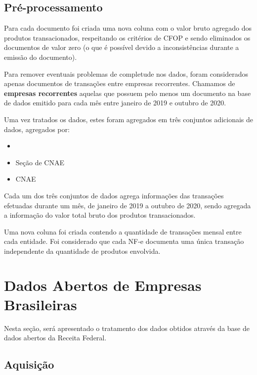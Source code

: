 \subsection{Pré-processamento}
\label{section:base-de-dados:dados-de-documentos-fiscais:preprocessamento}

Para cada documento foi criada uma nova coluna com o valor bruto agregado dos produtos transacionados, respeitando os critérios de CFOP e sendo eliminados os documentos de valor zero (o que é possível devido a inconsistências durante a emissão do documento).

Para remover eventuais problemas de completude nos dados, foram considerados apenas documentos de transações entre empresas recorrentes. Chamamos de \textbf{empresas recorrentes} aquelas que possuem pelo menos um documento na base de dados emitido para cada mês entre janeiro de 2019 e outubro de 2020.

Uma vez tratados os dados, estes foram agregados em três conjuntos adicionais de dados, agregados por:

\begin{itemize}
    \item {}
    \item Seção de CNAE
    \item CNAE
\end{itemize}

Cada um dos três conjuntos de dados agrega informações das transações efetuadas durante um mês, de janeiro de 2019 a outubro de 2020, sendo agregada a informação do valor total bruto dos produtos transacionados.

Uma nova coluna foi criada contendo a quantidade de transações mensal entre cada entidade. Foi considerado que cada NF-e documenta uma única transação independente da quantidade de produtos envolvida.

\section{Dados Abertos de Empresas Brasileiras}
\label{section:base-de-dados:dados-abertos}

Nesta seção, será apresentado o tratamento dos dados obtidos através da base de dados abertos da Receita Federal.

\subsection{Aquisição}
\label{section:base-de-dados:dados-abertos:aquisicao}

